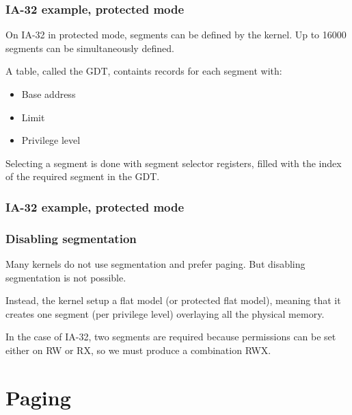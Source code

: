 
\begin{frame}
  \frametitle{IA-32 example, protected mode}

  On IA-32 in protected mode, segments can be defined by the
  kernel. Up to 16000 segments can be simultaneously defined.

  \-

  A table, called the GDT, containts records for each segment with:

  \begin{itemize}
  \item
    Base address
  \item
    Limit
  \item
    Privilege level
  \end{itemize}

  \-

  Selecting a segment is done with segment selector registers, filled
  with the index of the required segment in the GDT.

\end{frame}


\begin{frame}
  \frametitle{IA-32 example, protected mode}

  \begin{center}
  \end{center}

\end{frame}


\begin{frame}
  \frametitle{Disabling segmentation}

  Many kernels do not use segmentation and prefer paging. But
  disabling segmentation is not possible.

  \-

  Instead, the kernel setup a flat model (or protected flat model),
  meaning that it creates one segment (per privilege level) overlaying
  all the physical memory.

  \-

  In the case of IA-32, two segments are required because permissions
  can be set either on RW or RX, so we must produce a combination RWX.

\end{frame}

%
%

\section{Paging}

